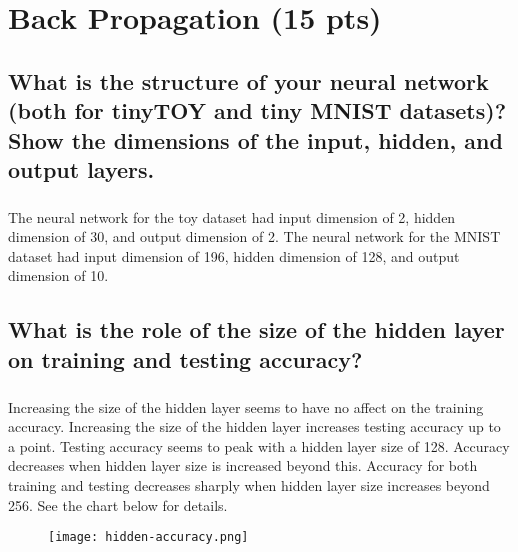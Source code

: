 \documentclass[11pt]{article}
\begin{document}
\thispagestyle{empty}

\newlength{\boxlength}\setlength{\boxlength}{\textwidth}
\addtolength{\boxlength}{-4mm}

\begin{center}
\end{center}




\section{Back Propagation (15 pts)}

\subsection{What is the structure of your neural network (both for tinyTOY and tiny MNIST datasets)? Show the dimensions of the input, hidden, and output layers.}

\subparagraph{}

The neural network for the toy dataset had input dimension of 2, hidden dimension of 30, and output dimension of 2. The neural network for the MNIST dataset had input dimension of 196, hidden dimension of 128, and output dimension of 10.

\subsection{What is the role of the size of the hidden layer on training and testing accuracy?}

\subparagraph{}

Increasing the size of the hidden layer seems to have no affect on the training accuracy. Increasing the size of the hidden layer increases testing accuracy up to a point. Testing accuracy seems to peak with a hidden layer size of 128. Accuracy decreases when hidden layer size is increased beyond this. Accuracy for both training and testing decreases sharply when hidden layer size increases beyond 256. See the chart below for details.

\begin{figure}[h]
	\texttt{[image: hidden-accuracy.png]}
	\label{fig:graph}
\end{figure}
\end{document}
